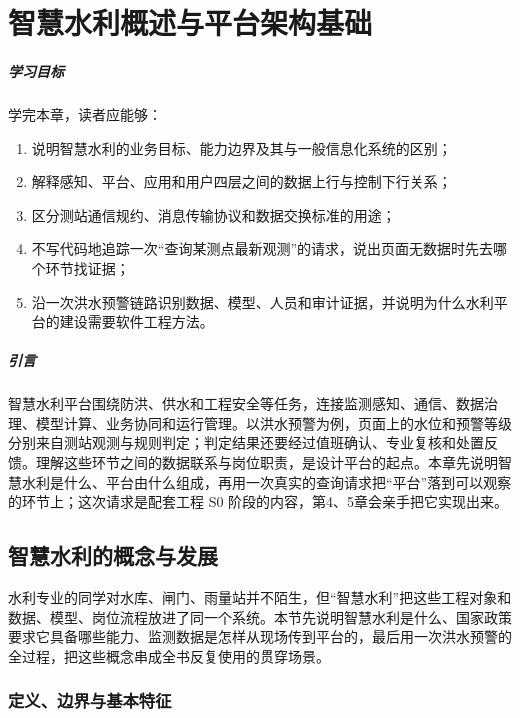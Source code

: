 \chapter{智慧水利概述与平台架构基础}

\paragraph*{学习目标}

学完本章，读者应能够：

\begin{enumerate}
\item 说明智慧水利的业务目标、能力边界及其与一般信息化系统的区别；
\item 解释感知、平台、应用和用户四层之间的数据上行与控制下行关系；
\item 区分测站通信规约、消息传输协议和数据交换标准的用途；
\item 不写代码地追踪一次“查询某测点最新观测”的请求，说出页面无数据时先去哪个环节找证据；
\item 沿一次洪水预警链路识别数据、模型、人员和审计证据，并说明为什么水利平台的建设需要软件工程方法。
\end{enumerate}

\paragraph*{引言}

智慧水利平台围绕防洪、供水和工程安全等任务，连接监测感知、通信、数据治理、模型计算、业务协同和运行管理。以洪水预警为例，页面上的水位和预警等级分别来自测站观测与规则判定；判定结果还要经过值班确认、专业复核和处置反馈。理解这些环节之间的数据联系与岗位职责，是设计平台的起点。本章先说明智慧水利是什么、平台由什么组成，再用一次真实的查询请求把“平台”落到可以观察的环节上；这次请求是配套工程 S0 阶段的内容，第4、5章会亲手把它实现出来。

\section{智慧水利的概念与发展}

水利专业的同学对水库、闸门、雨量站并不陌生，但“智慧水利”把这些工程对象和数据、模型、岗位流程放进了同一个系统。本节先说明智慧水利是什么、国家政策要求它具备哪些能力、监测数据是怎样从现场传到平台的，最后用一次洪水预警的全过程，把这些概念串成全书反复使用的贯穿场景。

\subsection{定义、边界与基本特征}

